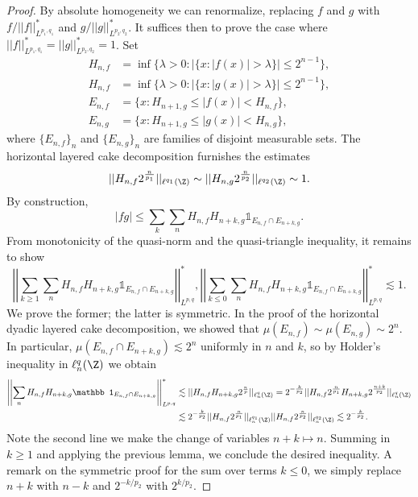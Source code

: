 \documentclass[reqno]{amsart}
\theoremstyle{definition}
\theoremstyle{remark}
\begin{document}
\begin{proof}
	By absolute homogeneity we can renormalize, replacing $f$ and $g$ with $ f/||f||^*_{L^{p_1, q_1}}$ and $g/||g||^*_{L^{p_2, q_2}}$. It suffices then to prove the case where $||f||^*_{L^{p_1, q_1}} = ||g||^*_{L^{p_2, q_2}} = 1$. Set 
		\begin{align*}
			H_{n, f}
				&= \inf\{ \lambda > 0 : |\{ x:  |f(x)| > \lambda \}| \leq 2^{n - 1} \}, \\
			H_{n, f}
				&= \inf\{ \lambda > 0 : |\{ x:  |g(x)| > \lambda \}| \leq 2^{n - 1} \}, \\
			E_{n, f}
				&= \{ x : H_{n + 1, g} \leq |f(x)| < H_{n, f}\}, \\
			E_{n, g} 
				&= \{ x : H_{n + 1, g} \leq |g(x)| < H_{n, g} \},	
		\end{align*}
	where $\{E_{n, f}\}_{n}$ and $\{E_{n, g}\}_{n}$ are families of disjoint measurable sets. The horizontal layered cake decomposition furnishes the estimates
		\[|| H_{n, f} 2^{\frac{n}{p_1}}||_{\ell^{q_1} (\Z)} \sim || H_{n, g} 2^{\frac{n}{p_2}}||_{\ell^{q_2} (\Z)} \sim 1. \]	
	By construction, 
		\[ |fg| \leq \sum_k \sum_n H_{n, f} H_{n + k, g} \mathbb 1_{E_{n, f} \cap E_{n + k, g}}. \]
	From monotonicity of the quasi-norm and the quasi-triangle inequality, it remains to show
		\[ \left| \left|\sum_{k \geq 1} \sum_n H_{n, f} H_{n + k, g} \mathbb 1_{E_{n, f} \cap E_{n + k, g}}\right| \right|_{L^{p, q}}^*, \left| \left|\sum_{k \leq 0} \sum_n H_{n, f} H_{n + k, g} \mathbb 1_{E_{n, f} \cap E_{n + k, g}}\right| \right|_{L^{p, q}}^* \lesssim 1. \]	
	We prove the former; the latter is symmetric. In the proof of the horizontal dyadic layered cake decomposition, we showed that $\mu(E_{n, f}) \sim \mu(E_{n, g}) \sim 2^n$. In particular, $\mu(E_{n, f} \cap E_{n + k, g}) \lesssim 2^n$ uniformly in $n$ and $k$, so by Holder's inequality in $\ell^q_n (\Z)$ we obtain 
		\begin{align*}
			\left|\left|  \sum_n H_{n, f} H_{n + k, g} \mathbb 1_{E_{n, f} \cap E_{n + k, g}} \right| \right|_{L^{p, q}}^*
				& \lesssim ||H_{n, f} H_{n + k, g} 2^{\frac{n}{p}} ||_{\ell^q_n (\Z)} = 2^{-\frac{k}{p_2}} ||H_{n, f} 2^\frac{n}{p_1} H_{n + k, g} 2^{\frac{n + k}{p_2}} ||_{\ell^q_n (\Z)} \\
				&\lesssim 2^{-\frac{k}{p_2}} ||H_{n, f} 2^\frac{n}{p_1}||_{\ell^{q_1}_n (\Z)} ||H_{n, f} 2^\frac{n}{p_2} ||_{\ell^{q_2}_n (\Z)} \lesssim 2^{-\frac{k}{p_2}}.
		\end{align*}	
	Note the second line we make the change of variables $n + k \mapsto n$. Summing in $k \geq 1$ and applying the previous lemma, we conclude the desired inequality. A remark on the symmetric proof for the sum over terms $k \leq 0$, we simply replace $n + k$ with $n - k$ and $2^{-k/p_2}$ with $2^{k/p_2}	$. 
\end{proof}
\end{document}
